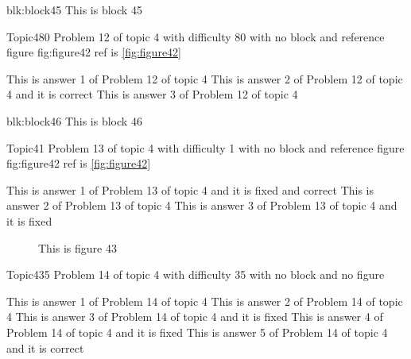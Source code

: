 \documentclass[master]{exam}
\begin{document}
\begin{block}{blk:block45}
This is block 45
\end{block}


\begin{problem}{Topic4}{80}
	Problem 12 of topic 4 with difficulty 80 with no block and reference figure fig:figure42 ref is \ref{fig:figure42}
	\begin{answers}
		\answer This is answer 1 of Problem 12 of topic 4 
		\answer[correct] This is answer 2 of Problem 12 of topic 4 and it is correct
		\answer This is answer 3 of Problem 12 of topic 4 
	\end{answers}
\end{problem}



\begin{block}{blk:block46}
This is block 46
\end{block}


\begin{problem}{Topic4}{1}
	Problem 13 of topic 4 with difficulty 1 with no block and reference figure fig:figure42 ref is \ref{fig:figure42}
	\begin{answers}
		 This is answer 1 of Problem 13 of topic 4 and it is fixed and correct
		\answer This is answer 2 of Problem 13 of topic 4 
		\answer[fixed] This is answer 3 of Problem 13 of topic 4 and it is fixed
	\end{answers}
\end{problem}



\begin{figure}
	\begin{center}
		This is figure 43 
		\label{fig:figure43}
	\end{center}
\end{figure}

\begin{problem}{Topic4}{35}
	Problem 14 of topic 4 with difficulty 35 with no block and no figure
	\begin{answers}
		\answer This is answer 1 of Problem 14 of topic 4 
		\answer This is answer 2 of Problem 14 of topic 4 
		\answer[fixed] This is answer 3 of Problem 14 of topic 4 and it is fixed
		\answer[fixed] This is answer 4 of Problem 14 of topic 4 and it is fixed
		\answer[correct] This is answer 5 of Problem 14 of topic 4 and it is correct
	\end{answers}
\end{problem}
\end{document}
